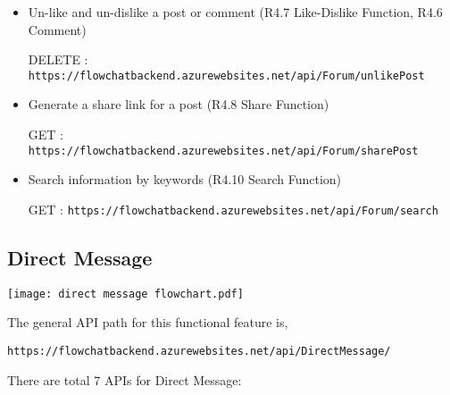\documentclass[11pt, a4paper]{article}
\begin{document}
\begin{itemize}
\item Un-like and un-dislike a post or comment (R4.7 Like-Dislike Function, R4.6 Comment)

DELETE :  \texttt{https://flowchatbackend.azurewebsites.net/api/Forum/unlikePost}

\item Generate a share link for a post (R4.8 Share Function)

GET :  \texttt{https://flowchatbackend.azurewebsites.net/api/Forum/sharePost}

\item Search information by keywords (R4.10 Search Function)

GET :  \texttt{https://flowchatbackend.azurewebsites.net/api/Forum/search}

\end{itemize}

\subsection{Direct Message}
\begin{center}
    \texttt{[image: direct message flowchart.pdf]}
\end{center}


The general API path for this functional feature is,

\begin{center}
    \texttt{https://flowchatbackend.azurewebsites.net/api/DirectMessage/}
\end{center}

There are total 7 APIs for Direct Message:
\end{document}
